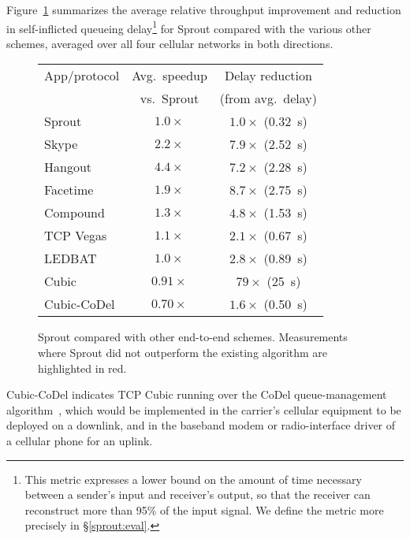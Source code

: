 Figure~\ref{f:sproutcompe2e} summarizes the average relative throughput
improvement and reduction in self-inflicted queueing
delay\footnote{This metric expresses a lower bound on the amount of
  time necessary between a sender's input and receiver's output, so
  that the receiver can reconstruct more than 95\% of the input
  signal. We define the metric more precisely in \S\ref{sprout:eval}.} for
Sprout compared with the various other schemes, averaged over all four
cellular networks in both directions.

\begin{figure}
\caption{Sprout compared with other end-to-end schemes. Measurements where
  Sprout did not outperform the existing algorithm are highlighted in
  red.}
\label{f:sproutcompe2e}

\begin{center}
\noindent \begin{tabular}{|l|c|c|}
\hline
App/protocol & Avg.~speedup & Delay reduction \\
& \footnotesize{vs.~Sprout} & \footnotesize{(from avg.~delay)}\\
\hline
\hline
\cellcolor{blue!20}Sprout & \cellcolor{blue!20}$1.0\times$ & \cellcolor{blue!20}$1.0\times$ (0.32~s) \\
\hline
Skype & $2.2\times$ & $7.9\times$ (2.52~s) \\
Hangout & $4.4\times$ & $7.2\times$ (2.28~s) \\
Facetime & $1.9\times$ & $8.7\times$ (2.75~s) \\
\hline
Compound & $1.3\times$ & $4.8\times$ (1.53~s) \\
TCP Vegas & $1.1\times$ & $2.1\times$ (0.67~s) \\
LEDBAT & $1.0\times$ & $2.8\times$ (0.89~s) \\
Cubic & \cellcolor{red!20}$0.91\times$ & $79\times$ (25~s)\\
\hline
Cubic-CoDel & \cellcolor{red!20}$0.70\times$ & $1.6\times$ (0.50~s) \\
\hline
\end{tabular}
\end{center}

\end{figure}

Cubic-CoDel indicates TCP Cubic running over the CoDel
queue-management algorithm~\cite{CoDel}, which would be implemented in the
carrier's cellular equipment to be deployed on a downlink, and in
the baseband modem or radio-interface driver of a cellular phone for an
uplink.

